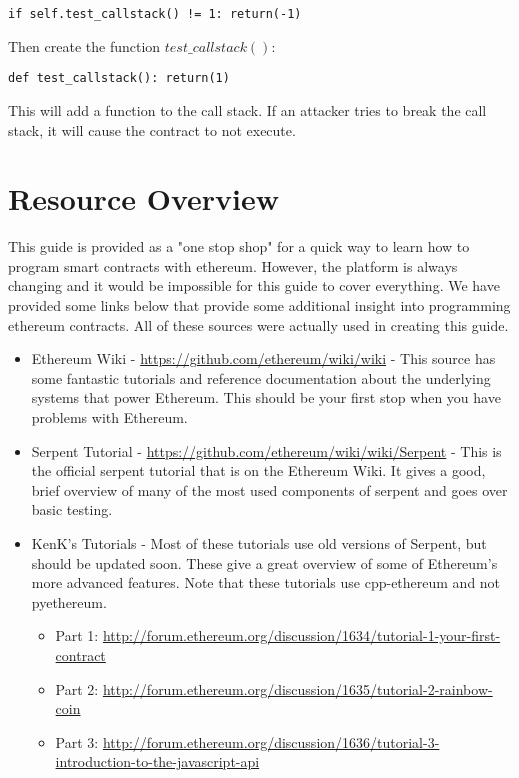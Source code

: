 \documentclass[12pt]{article}
\begin{document}
\begin{verbatim}
if self.test_callstack() != 1: return(-1)
\end{verbatim} 

Then create the function $test\_callstack()$:

\begin{verbatim}
def test_callstack(): return(1)
\end{verbatim}

This will add a function to the call stack. If an attacker tries to break the call stack, it will cause the contract to not execute.




\section{Resource Overview}

This guide is provided as a "one stop shop" for a quick way to learn how to program smart contracts with ethereum. However, the platform is always changing and it would be impossible for this guide to cover everything. We have provided some links below that provide some additional insight into programming ethereum contracts. All of these sources were actually used in creating this guide. 

\begin{itemize}
	\item Ethereum Wiki - \url{https://github.com/ethereum/wiki/wiki} - This source has some fantastic tutorials and reference documentation about the underlying systems that power Ethereum. This should be your first stop when you have problems with Ethereum.
	\item Serpent Tutorial - \url{https://github.com/ethereum/wiki/wiki/Serpent} - This is the official serpent tutorial that is on the Ethereum Wiki. It gives a good, brief overview of many of the most used components of serpent and goes over basic testing.
	\item KenK's Tutorials - Most of these tutorials use old versions of Serpent, but should be updated soon. These give a great overview of some of Ethereum's more advanced features. Note that these tutorials use cpp-ethereum and not pyethereum.
	\begin{itemize}
	\item Part 1: \url{http://forum.ethereum.org/discussion/1634/tutorial-1-your-first-contract}
	\item Part 2: \url{http://forum.ethereum.org/discussion/1635/tutorial-2-rainbow-coin}
	\item Part 3: \url{http://forum.ethereum.org/discussion/1636/tutorial-3-introduction-to-the-javascript-api}
	\end{itemize}
\end{itemize}



\end{document}
